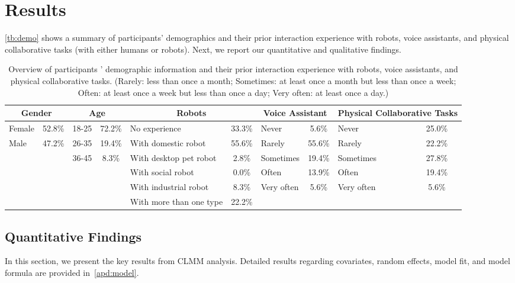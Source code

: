 \section{Results}
\autoref{tb:demo} shows a summary of participants' demographics and their prior interaction experience with robots, voice assistants, and physical collaborative tasks (with either humans or robots). Next, we report our quantitative and qualitative findings. 

\begin{table*}[]
\caption{Overview of participants ' demographic information and their prior interaction experience with robots, voice assistants, and physical collaborative tasks. (Rarely: less than once a month; Sometimes: at least once a month but less than once a week; Often: at least once a week but less than once a day; Very often: at least once a day.)}
\label{tb:demo}
\begin{tabular}{lclclclclc}
\hline
\multicolumn{2}{c}{Gender} & \multicolumn{2}{c}{Age} & \multicolumn{2}{c}{Robots} & \multicolumn{2}{c}{Voice Assistant} & \multicolumn{2}{c}{Physical Collaborative Tasks} \\ \hline
Female & 52.8\% & 18-25 & 72.2\% & No experience           & 33.3\% & Never      & 5.6\%  & Never      & 25.0\% \\
Male   & 47.2\% & 26-35 & 19.4\% & With domestic robot     & 55.6\% & Rarely     & 55.6\% & Rarely     & 22.2\% \\
       &        & 36-45 & 8.3\%  & With desktop pet robot   & 2.8\%  & Sometimes & 19.4\% & Sometimes & 27.8\% \\
       &        &       &        & With social robot       & 0.0\%  & Often      & 13.9\% & Often      & 19.4\% \\
       &        &       &        & With industrial robot    & 8.3\%  & Very often & 5.6\%  & Very often & 5.6\%  \\
       &        &       &        & With more than one type & 22.2\% &            &        &            &        \\ \hline
\end{tabular}
\end{table*}

\subsection{Quantitative Findings}
In this section, we present the key results from CLMM analysis. Detailed results regarding covariates, random effects, model fit, and model formula are provided in~\autoref{apd:model}.

